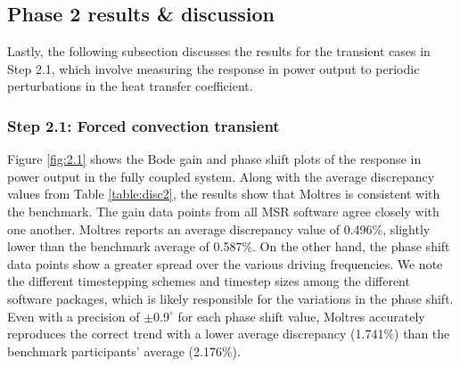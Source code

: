 \subsection{Phase 2 results \& discussion}

Lastly, the following subsection discusses the results for the transient cases
in Step 2.1, which involve measuring the response in power output to periodic
perturbations in the heat transfer coefficient.

\subsubsection{Step 2.1: Forced convection transient}

Figure \ref{fig:2.1} shows the Bode gain and phase shift plots of the response
in power output in the fully coupled system. Along with the average discrepancy
values from Table \ref{table:disc2}, the results show that Moltres is
consistent with the benchmark. The gain data points from all \gls{MSR} software
agree closely with one another. Moltres reports an average discrepancy value of
0.496\%, slightly lower than the benchmark average of 0.587\%. On the other
hand, the phase shift data points show a greater spread over the various driving
frequencies. We note the different timestepping schemes and timestep
sizes among the different software packages, which is likely responsible for
the variations in the phase shift. Even with a precision of
$\pm0.9^\circ$ for each phase shift value, Moltres accurately reproduces the
correct trend with a lower average discrepancy (1.741\%) than the benchmark
participants' average (2.176\%).

\FloatBarrier
